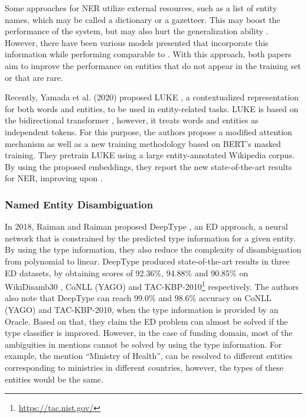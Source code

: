 \documentclass{report}
\theoremstyle{definition}
\theoremstyle{remark}
\begin{document}
Some approaches for NER utilize external resources, such as a list of entity names, which may be called a dictionary or a gazetteer. This may boost the performance of the system, but may also hurt the generalization ability \cite{NERsurvey}. However, there have been various models presented \cite{NERgazetteer, NERDict} that incorporate this information while performing comparable to \cite{flairpaper}. With this approach, both papers \cite{NERgazetteer, NERDict} aim to improve the performance on entities that do not appear in the training set or that are rare. 

Recently, Yamada et al. (2020) proposed LUKE \cite{LUKE}, a contextualized representation for both words and entities, to be used in entity-related tasks. LUKE is based on the bidirectional transformer \cite{transformer}, however, it treats words and entities as independent tokens. For this purpose, the authors propose a modified attention mechanism as well as a new training methodology based on BERT's \cite{BERT} masked training. They pretrain LUKE using a large entity-annotated Wikipedia corpus. By using the proposed embeddings, they report the new state-of-the-art results for NER, improving upon \cite{flairpaper}.

\subsubsection{Named Entity Disambiguation}

In 2018, Raiman and Raiman proposed DeepType \cite{raiman}, an ED approach, a neural network that is constrained by the predicted type information for a given entity. By using the type information, they also reduce the complexity of disambiguation from polynomial to linear. DeepType produced state-of-the-art results in three ED datasets, by obtaining scores of 92.36\%, 94.88\% and 90.85\% on WikiDisamb30 \cite{wikidisamb}, CoNLL (YAGO) \cite{CoNLLYago} and TAC-KBP-2010\footnote{\url{https://tac.nist.gov/}} respectively. The authors also note that DeepType can reach 99.0\% and 98.6\% accuracy on CoNLL (YAGO) and TAC-KBP-2010, when the type information is provided by an Oracle. Based on that, they claim the ED problem can almost be solved if the type classifier is improved. However, in the case of funding domain, most of the ambiguities in mentions cannot be solved by using the type information. For example, the mention ``Ministry of Health'', can be resolved to different entities corresponding to ministries in different countries, however,  the types of these entities would be the same.
\end{document}
